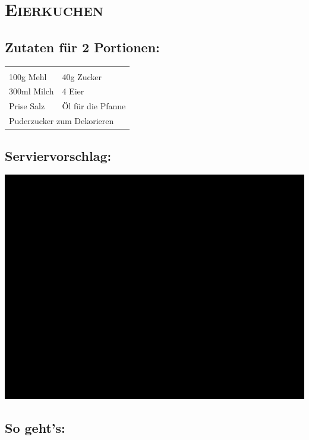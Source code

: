 \section{\textsc{Eierkuchen}}

\subsection*{Zutaten für 2 Portionen:}

\begin{tabular}{p{7.5cm} p{7.5cm}}
	& \\
	100g Mehl & 40g Zucker \\
	300ml Milch & 4 Eier \\
	Prise Salz & Öl für die Pfanne \\
	\multicolumn{2}{l}{Puderzucker zum Dekorieren}
\end{tabular}

\subsection*{Serviervorschlag:}

\includegraphics[width=\textwidth]{img/ph.jpg}

\subsection*{So geht's:}

